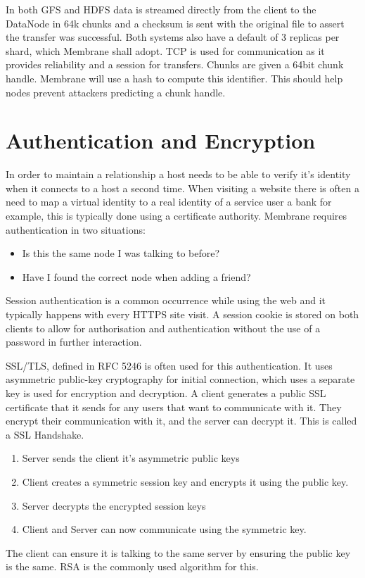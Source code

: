 \documentclass[11pt, a4paper, twocolumn, twoside]{report}
\begin{document}
In both GFS and HDFS data is streamed directly from the client to the DataNode in 64k chunks and a checksum is sent with the original file to assert the transfer was successful. Both systems also have a default of 3 replicas per shard, which Membrane shall adopt. TCP is used for communication as it provides reliability and a session for transfers. Chunks are given a 64bit chunk handle. Membrane will use a hash to compute this identifier. This should help nodes prevent attackers predicting a chunk handle.

\section{Authentication and Encryption} \label{sec:encryption}

In order to maintain a relationship a host needs to be able to verify it's identity when it connects to a host a second time. When visiting a website there is often a need to map a virtual identity to a real identity of a service user \citep{hericourt2001method} a bank for example, this is typically done using a certificate authority. Membrane requires authentication in two situations:
\begin{itemize}
 \item Is this the same node I was talking to before?
 \item Have I found the correct node when adding a friend?
\end{itemize}
Session authentication is a common occurrence while using the web and it typically happens with every HTTPS site visit. A session cookie is stored on both clients to allow for authorisation and authentication without the use of a password in further interaction. \citep{mayo2008security}

SSL/TLS, defined in RFC 5246 \citep{dierks2008transport} is often used for this authentication. It uses asymmetric public-key cryptography for initial connection, which uses a separate key is used for encryption and decryption. A client generates a public SSL certificate that it sends for any users that want to communicate with it. They encrypt their communication with it, and the server can decrypt it. This is called a SSL Handshake.
\begin{enumerate}
 \item Server sends the client it's asymmetric public keys
 \item Client creates a symmetric session key and encrypts it using the public key.
 \item Server decrypts the encrypted session keys
 \item Client and Server can now communicate using the symmetric key.
\end{enumerate}
The client can ensure it is talking to the same server by ensuring the public key is the same. RSA is the commonly used algorithm for this.
\end{document}
